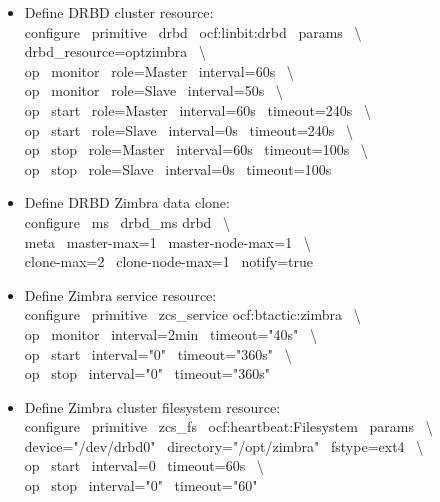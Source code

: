 \documentclass[a4paper, 12pt]{book}
\begin{document}
\begin{itemize}
	\item Define DRBD cluster resource:\\
		configure \ primitive \ drbd \ ocf:linbit:drbd \ params \ \textbackslash \\
			drbd\_resource=optzimbra \ \textbackslash \\
			op \ monitor \ role=Master \ interval=60s \ \textbackslash \\
			op \ monitor \ role=Slave \ interval=50s \ \textbackslash \\
			op \ start \ role=Master \ interval=60s \ timeout=240s \ \textbackslash \\
			op \ start \ role=Slave \ interval=0s \ timeout=240s \ \textbackslash \\
			op \ stop \ role=Master \ interval=60s \ timeout=100s \ \textbackslash \\
			op \ stop \ role=Slave \ interval=0s \ timeout=100s\\
\end{itemize}

\begin{itemize}
	\item Define DRBD Zimbra data clone:\\
		configure \ ms \ drbd\_ms drbd \ \textbackslash \\
		meta \ master-max=1 \ master-node-max=1 \ \textbackslash \\
		clone-max=2 \ clone-node-max=1 \ notify=true\\
\end{itemize}

\begin{itemize}
	\item Define Zimbra service resource:\\
		configure \ primitive \ zcs\_service ocf:btactic:zimbra \ \textbackslash \\
		op \ monitor \ interval=2min \ timeout="40s" \ \textbackslash \\
		op \ start \ interval="0" \ timeout="360s" \ \textbackslash \\
		op \ stop \ interval="0" \ timeout="360s" \ \\
\end{itemize}

\begin{itemize}
	\item Define Zimbra cluster filesystem resource:\\
		configure \ primitive \ zcs\_fs \ ocf:heartbeat:Filesystem \ params \ \textbackslash \\ 
		device="/dev/drbd0" \ directory="/opt/zimbra" \ fstype=ext4 \ \textbackslash \\
		op \ start \ interval=0 \ timeout=60s \ \textbackslash \\
		op \ stop \ interval="0" \ timeout="60"\\
\end{itemize}
\end{document}
